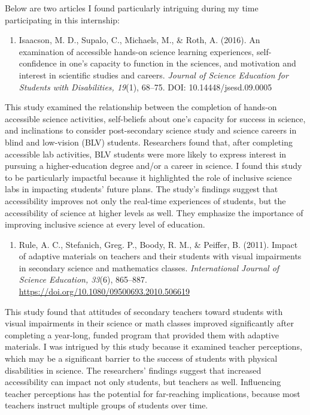 \documentclass[11.5pt]{sig-alternate}
\begin{document}
\begin{large}
Below are two articles I found particularly intriguing during my time participating in this internship:

\begin{enumerate}
    \item Isaacson, M. D., Supalo, C., Michaels, M., \& Roth, A. (2016). An examination of accessible hands-on science learning experiences, self-confidence in one’s capacity to function in the sciences, and motivation and interest in scientific studies and careers. \textit{Journal of Science Education for Students with Disabilities, 19}(1), 68–75. DOI: 10.14448/jsesd.09.0005
\end{enumerate}
This study examined the relationship between the completion of hands-on accessible science activities, self-beliefs about one’s capacity for success in science, and inclinations to consider post-secondary science study and science careers in blind and low-vision (BLV) students. Researchers found that, after completing accessible lab activities, BLV students were more likely to express interest in pursuing a higher-education degree and/or a career in science. I found this study to be particularly impactful because it highlighted the role of inclusive science labs in impacting students’ future plans. The study’s findings suggest that accessibility improves not only the real-time experiences of students, but the accessibility of science at higher levels as well. They emphasize the importance of improving inclusive science at every level of education.
\begin{enumerate}[start=2]
    \item  Rule, A. C., Stefanich, Greg. P., Boody, R. M., \& Peiffer, B. (2011). Impact of adaptive materials on teachers and their students with visual impairments in secondary science and mathematics classes. \textit{International Journal of Science Education, 33}(6), 865–887. \url{https://doi.org/10.1080/09500693.2010.506619}
\end{enumerate}

This study found that attitudes of secondary teachers toward students with visual impairments in their science or math classes improved significantly after completing a year-long, funded program that provided them with adaptive materials. I was intrigued by this study because it examined teacher perceptions, which may be a significant barrier to the success of students with physical disabilities in science. The researchers’ findings suggest that increased accessibility can impact not only students, but teachers as well. Influencing teacher perceptions has the potential for far-reaching implications, because most teachers instruct multiple groups of students over time. 


\end{large}
\end{document}
